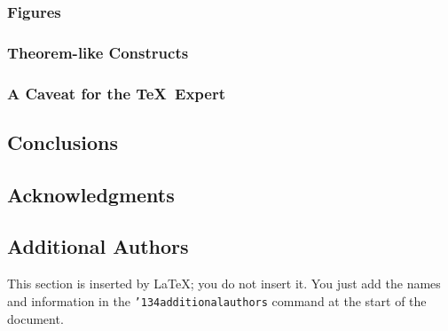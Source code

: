 \documentclass{sig-alternate}
\begin{document}
\subsubsection{Figures}
\subsubsection{Theorem-like Constructs}
\subsubsection*{A Caveat for the \TeX\ Expert}
\subsection{Conclusions}
\subsection{Acknowledgments}
\subsection{Additional Authors}
This section is inserted by \LaTeX; you do not insert it.
You just add the names and information in the
\texttt{{\char'134}additionalauthors} command at the start
of the document.
\end{document}
